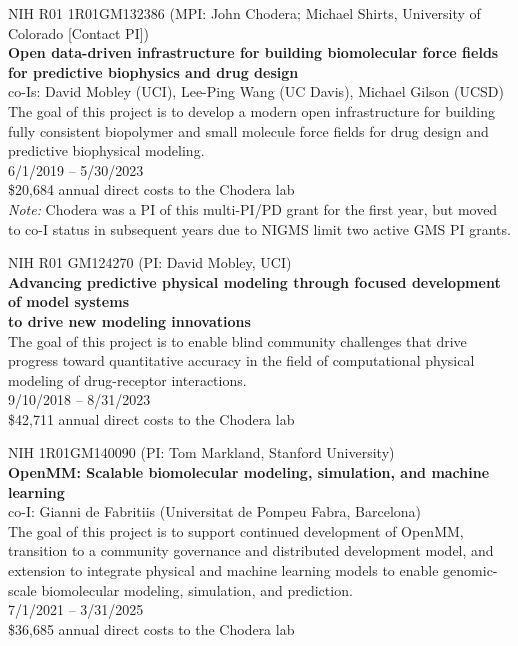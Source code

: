 \documentclass[10pt]{article}
\begin{document}
\vspace{1.5ex}


NIH R01 1R01GM132386 (MPI: John Chodera; Michael Shirts, University of Colorado [Contact PI]) \\
{\bf Open data-driven infrastructure for building biomolecular force fields for predictive biophysics and drug design} \\
co-Is: David Mobley (UCI), Lee-Ping Wang (UC Davis), Michael Gilson (UCSD) \\
The goal of this project is to develop a modern open infrastructure for building fully consistent biopolymer and small molecule force fields for drug design and predictive biophysical modeling. \\
6/1/2019 -- 5/30/2023 \\
\$20,684 annual direct costs to the Chodera lab\\
\emph{Note:} Chodera was a PI of this multi-PI/PD grant for the first year, but moved to co-I status in subsequent years due to NIGMS limit two active GMS PI grants.

\vspace{1.5ex}

NIH R01 GM124270 (PI: David Mobley, UCI) \\
{\bf Advancing predictive physical modeling through focused development of model systems\\ to drive new modeling innovations}\\
The goal of this project is to enable blind community challenges that drive progress toward quantitative accuracy in the field of computational physical modeling of drug-receptor interactions.\\
9/10/2018 -- 8/31/2023\\
\$42,711 annual direct costs to the Chodera lab

\vspace{1.5ex}

NIH 1R01GM140090 (PI: Tom Markland, Stanford University)\\
{\bf OpenMM: Scalable biomolecular modeling, simulation, and machine learning}\\
co-I: Gianni de Fabritiis (Universitat de Pompeu Fabra, Barcelona)\\
The goal of this project is to support continued development of OpenMM, transition to a community governance and distributed development model, and extension to integrate physical and machine learning models to enable genomic-scale biomolecular modeling, simulation, and prediction.\\
7/1/2021 -- 3/31/2025\\
\$36,685 annual direct costs to the Chodera lab
\end{document}
